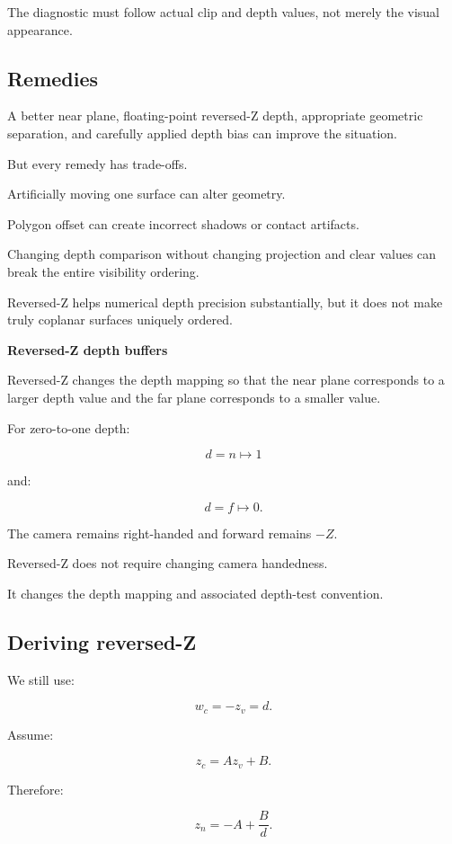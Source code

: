 The diagnostic must follow actual clip and depth values, not merely the visual appearance.

\subsection{Remedies}\label{02-foundations-ii-ch033-remedies}

A better near plane, floating-point reversed-Z depth, appropriate geometric separation, and carefully applied depth bias can improve the situation.

But every remedy has trade-offs.

Artificially moving one surface can alter geometry.

Polygon offset can create incorrect shadows or contact artifacts.

Changing depth comparison without changing projection and clear values can break the entire visibility ordering.

Reversed-Z helps numerical depth precision substantially, but it does not make truly coplanar surfaces uniquely ordered.

\textbf{Reversed-Z depth buffers}

Reversed-Z changes the depth mapping so that the near plane corresponds to a larger depth value and the far plane corresponds to a smaller value.

For zero-to-one depth:

\[
 \boxed{ d=n\mapsto1 }
\]

and:

\[
 \boxed{ d=f\mapsto0 }.
\]

The camera remains right-handed and forward remains \(-Z\).

Reversed-Z does not require changing camera handedness.

It changes the depth mapping and associated depth-test convention.

\subsection{Deriving reversed-Z}\label{02-foundations-ii-ch033-deriving-reversed-z}

We still use:

\[
 w_c=-z_v=d.
\]

Assume:

\[
 z_c=Az_v+B.
\]

Therefore:

\[
 z_n=-A+\frac Bd.
\]


